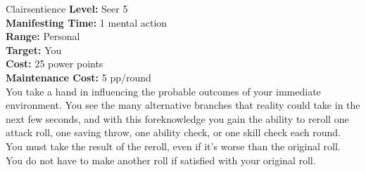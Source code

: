 {Clairsentience}
{
	\textbf{Level:}
	Seer 5\\
	\textbf{Manifesting Time:}
	1 mental action\\
	\textbf{Range:}
	Personal\\
	\textbf{Target:}
	You\\
	\textbf{Cost:}
	25 power points\\
	\textbf{Maintenance Cost:}
	5 pp/round\\
}
{
	You take a hand in influencing the probable outcomes of your immediate environment. You see the many alternative branches that reality could take in the next few seconds, and with this foreknowledge you gain the ability to reroll one attack roll, one saving throw, one ability check, or one skill check each round. You must take the result of the reroll, even if it’s worse than the original roll. You do not have to make another roll if satisfied with your original roll.
}